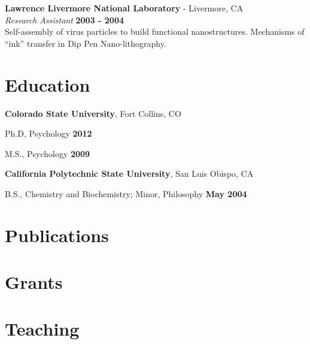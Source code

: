 \documentclass[margin,line]{res}
\newenvironment{list1}{
  \begin{list}{\ding{113}}{%
      \setlength{\itemsep}{0in}
      \setlength{\parsep}{0in} \setlength{\parskip}{0in}
      \setlength{\topsep}{0in} \setlength{\partopsep}{0in}
      \setlength{\leftmargin}{0.17in}}}{\end{list}}
\begin{document}
\begin{resume}
{\bf Lawrence Livermore National Laboratory} - Livermore, CA\\
{\em Research Assistant} \hfill {\bf 2003 - 2004}\\
Self-assembly of virus particles to build functional nanostructures. Mechanisms of ``ink'' transfer in Dip Pen Nano-lithography.

\section{\sc Education}
{\bf Colorado State University}, Fort Collins, CO\\
\vspace*{-.1in}
\begin{list1}
\item[] Ph.D, Psychology \hfill {\bf 2012}
\item[] M.S., Psychology \hfill {\bf 2009}
\end{list1}

{\bf California Polytechnic State University}, San Luis Obispo, CA\\
\vspace*{-.1in}
\begin{list1}
\item[] B.S., Chemistry and Biochemistry; Minor, Philosophy \hfill {\bf May 2004}
\end{list1}

\section{\sc Publications}



\section{\sc Grants}




% 

\section{\sc Teaching}


\end{resume}
\end{document}
